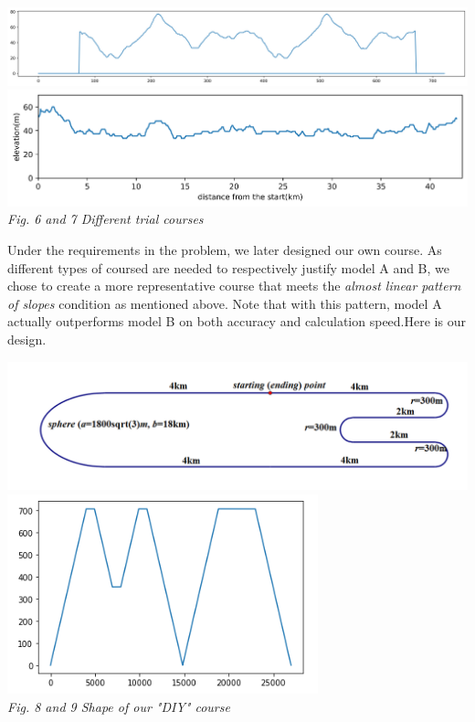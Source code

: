 \documentclass[12pt]{article}
\theoremstyle{definition}
\theoremstyle{remark}
\numberwithin{equation}{section}
\begin{document}
	\begin{center}
		\includegraphics[width=15cm]{6.png}\\
		\includegraphics[width=15cm]{7.png}\\
		\small \textit{Fig. 6 and 7  Different trial courses}
	\end{center}	
	Under the requirements in the problem, we later designed our own course. As different types of coursed are needed to respectively justify model A and B, we chose to create a more representative course that meets the \textit{almost linear pattern of slopes} condition as mentioned above. Note that with this pattern, model A actually outperforms model B on both accuracy and calculation speed.Here is our design.

	\begin{center}
		\includegraphics[width=15cm]{8.png}\\
		\includegraphics[width=9cm]{9.png}\\
		\small \textit{Fig. 8 and 9  Shape of our "DIY" course }
	\end{center}
\end{document}
